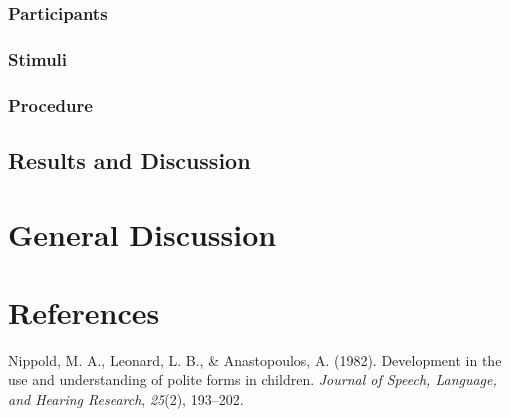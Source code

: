 \documentclass[10pt, letterpaper]{article}
\begin{document}
\subsubsection{Participants}\label{participants-2}

\subsubsection{Stimuli}\label{stimuli-2}

\subsubsection{Procedure}\label{procedure-2}

\subsection{Results and Discussion}\label{results-and-discussion-2}

\section{General Discussion}\label{general-discussion}

\section{References}\label{references}

\setlength{\parindent}{-0.1in} \setlength{\leftskip}{0.125in} \noindent

\hypertarget{refs}{}
\hypertarget{ref-nippold1982}{}
Nippold, M. A., Leonard, L. B., \& Anastopoulos, A. (1982). Development
in the use and understanding of polite forms in children. \emph{Journal
of Speech, Language, and Hearing Research}, \emph{25}(2), 193--202.
\end{document}
